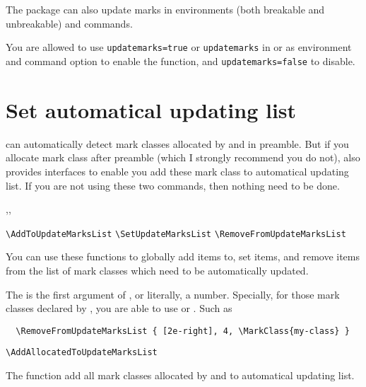 \documentclass{l3doc}
\begin{document}
\section{}

The  package can also update marks in  environments
(both breakable and unbreakable) and  commands.

You are allowed to use \verb|updatemarks=true| or \verb|updatemarks| in 
or as environment and command option to enable the function, and 
\verb|updatemarks=false| to disable.


\section{Set automatical updating list}

 can automatically detect mark classes allocated by 
and  in preamble. But if you allocate mark class after preamble
(which I strongly recommend you do not),
 also provides interfaces to enable you add these mark class to 
automatical updating list. If you are not using these two commands, then nothing need 
to be done.


\begin{function}{\AddToUpdateMarksList,\SetUpdateMarksList,\RemoveFromUpdateMarksList}
  \begin{syntax}
    \verb|\AddToUpdateMarksList|      
    \verb|\SetUpdateMarksList|        
    \verb|\RemoveFromUpdateMarksList| 
  \end{syntax}
You can use these functions to globally add items to, set items, and remove items from 
the list of mark classes which need to be automatically updated.

The  is the first argument of , or literally, a number.
Specially, for those mark classes declared by , you are able to use 
 or . Such as 
\begin{verbatim}
  \RemoveFromUpdateMarksList { [2e-right], 4, \MarkClass{my-class} }
\end{verbatim}
\end{function}


\begin{function}{\AddAllocatedToUpdateMarksList}
  \begin{syntax}
    \verb|\AddAllocatedToUpdateMarksList|
  \end{syntax}
The function add all mark classes allocated by  and 
to automatical updating list.
\end{function}
\end{document}

